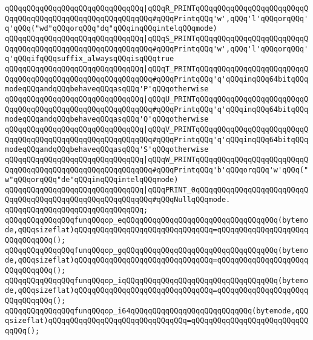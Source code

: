 \verb|qQQqqQQqqQQqqQQqqQQqqQQqqQQqqQQq|\verb#|qQQqR_PRINTqQQqqQQqqQQqqQQqqQQqqQQqqQQqqQQqqQQqqQQqqQQqqQQqqQQqqQQqqQQq#\verb|#qQQqPrintqQQq'w',qQQq'l'qQQqorqQQq'q'qQQq("wd"qQQqorqQQq"dq"qQQqinqQQqintelqQQqmode)|\newline
\verb|qQQqqQQqqQQqqQQqqQQqqQQqqQQqqQQq|\verb#|qQQqS_PRINTqQQqqQQqqQQqqQQqqQQqqQQqqQQqqQQqqQQqqQQqqQQqqQQqqQQqqQQqqQQq#\verb|#qQQqPrintqQQq'w',qQQq'l'qQQqorqQQq'q'qQQqifqQQqsuffix_alwaysqQQqisqQQqtrue|\newline
\verb|qQQqqQQqqQQqqQQqqQQqqQQqqQQqqQQq|\verb#|qQQqT_PRINTqQQqqQQqqQQqqQQqqQQqqQQqqQQqqQQqqQQqqQQqqQQqqQQqqQQqqQQqqQQq#\verb|#qQQqPrintqQQq'q'qQQqinqQQq64bitqQQqmodeqQQqandqQQqbehaveqQQqasqQQq'P'qQQqotherwise|\newline
\verb|qQQqqQQqqQQqqQQqqQQqqQQqqQQqqQQq|\verb#|qQQqU_PRINTqQQqqQQqqQQqqQQqqQQqqQQqqQQqqQQqqQQqqQQqqQQqqQQqqQQqqQQqqQQq#\verb|#qQQqPrintqQQq'q'qQQqinqQQq64bitqQQqmodeqQQqandqQQqbehaveqQQqasqQQq'Q'qQQqotherwise|\newline
\verb|qQQqqQQqqQQqqQQqqQQqqQQqqQQqqQQq|\verb#|qQQqV_PRINTqQQqqQQqqQQqqQQqqQQqqQQqqQQqqQQqqQQqqQQqqQQqqQQqqQQqqQQqqQQq#\verb|#qQQqPrintqQQq'q'qQQqinqQQq64bitqQQqmodeqQQqandqQQqbehaveqQQqasqQQq'S'qQQqotherwise|\newline
\verb|qQQqqQQqqQQqqQQqqQQqqQQqqQQqqQQq|\verb#|qQQqW_PRINTqQQqqQQqqQQqqQQqqQQqqQQqqQQqqQQqqQQqqQQqqQQqqQQqqQQqqQQqqQQq#\verb|#qQQqPrintqQQq'b'qQQqorqQQq'w'qQQq("w"qQQqorqQQq"de"qQQqinqQQqintelqQQqmode)|\newline
\verb|qQQqqQQqqQQqqQQqqQQqqQQqqQQqqQQq|\verb#|qQQqPRINT_0qQQqqQQqqQQqqQQqqQQqqQQqqQQqqQQqqQQqqQQqqQQqqQQqqQQqqQQqqQQq#\verb|#qQQqNullqQQqmode.|\newline
\verb|qQQqqQQqqQQqqQQqqQQqqQQqqQQqqQQq;|\newline
\newline
\verb|qQQqqQQqqQQqqQQqfunqQQqop_eqQQqqQQqqQQqqQQqqQQqqQQqqQQqqQQqqQQq(bytemode,qQQqsizeflat)qQQqqQQqqQQqqQQqqQQqqQQqqQQqqQQq=qQQqqQQqqQQqqQQqqQQqqQQqqQQqqQQq();|\newline
\verb|qQQqqQQqqQQqqQQqfunqQQqop_gqQQqqQQqqQQqqQQqqQQqqQQqqQQqqQQqqQQq(bytemode,qQQqsizeflat)qQQqqQQqqQQqqQQqqQQqqQQqqQQqqQQq=qQQqqQQqqQQqqQQqqQQqqQQqqQQqqQQq();|\newline
\verb|qQQqqQQqqQQqqQQqfunqQQqop_iqQQqqQQqqQQqqQQqqQQqqQQqqQQqqQQqqQQq(bytemode,qQQqsizeflat)qQQqqQQqqQQqqQQqqQQqqQQqqQQqqQQq=qQQqqQQqqQQqqQQqqQQqqQQqqQQqqQQq();|\newline
\verb|qQQqqQQqqQQqqQQqfunqQQqop_i64qQQqqQQqqQQqqQQqqQQqqQQqqQQq(bytemode,qQQqsizeflat)qQQqqQQqqQQqqQQqqQQqqQQqqQQqqQQq=qQQqqQQqqQQqqQQqqQQqqQQqqQQqqQQq();|\newline
